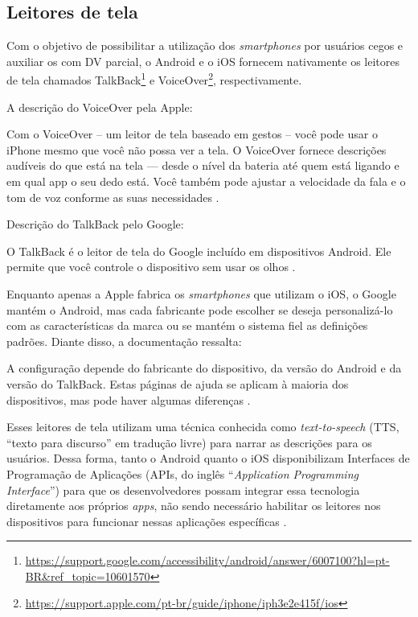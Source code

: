 \subsection{Leitores de tela}

Com o objetivo de possibilitar a utilização dos \emph{smartphones} por usuários cegos e auxiliar os com DV parcial, o Android e o iOS
fornecem nativamente os leitores de tela chamados TalkBack\footnote{\url{https://support.google.com/accessibility/android/answer/6007100?hl=pt-BR&ref_topic=10601570}}
e VoiceOver\footnote{\url{https://support.apple.com/pt-br/guide/iphone/iph3e2e415f/ios}}, respectivamente.

A descrição do VoiceOver pela Apple:

\begin{citacao}
    Com o VoiceOver – um leitor de tela baseado em gestos – você pode usar o iPhone mesmo que você não possa ver a tela.
    O VoiceOver fornece descrições audíveis do que está na tela — desde o nível da bateria até quem está ligando e em qual
    app o seu dedo está. Você também pode ajustar a velocidade da fala e o tom de voz conforme as suas necessidades \cite{VoiceOver2021}.
\end{citacao}

Descrição do TalkBack pelo Google:

\begin{citacao}
    O TalkBack é o leitor de tela do Google incluído em dispositivos Android.
    Ele permite que você controle o dispositivo sem usar os olhos \cite{TalkBak2021}.
\end{citacao}

Enquanto apenas a Apple fabrica os \emph{smartphones} que utilizam o iOS, o Google mantém o Android, mas cada fabricante
pode escolher se deseja personalizá-lo com as características da marca ou se mantém o sistema fiel as definições padrões. Diante disso,
a documentação ressalta:

\begin{citacao}
    A configuração depende do fabricante do dispositivo, da versão do Android e da versão do TalkBack.
    Estas páginas de ajuda se aplicam à maioria dos dispositivos, mas pode haver algumas diferenças \cite{TalkBak2021}.
\end{citacao}

Esses leitores de tela utilizam uma técnica conhecida como \emph{text-to-speech} (TTS, ``texto para discurso'' em tradução livre)
para narrar as descrições para os usuários. Dessa forma, tanto o Android quanto o iOS disponibilizam Interfaces de Programação de Aplicações
(APIs, do inglês ``\emph{Application Programming Interface}'') para que os desenvolvedores possam integrar essa tecnologia diretamente aos
próprios \emph{apps}, não sendo necessário habilitar os leitores nos dispositivos para funcionar nessas aplicações específicas
\cite{Heesook2017,Biase2018,Oliveira2019,Caballero2020}.


